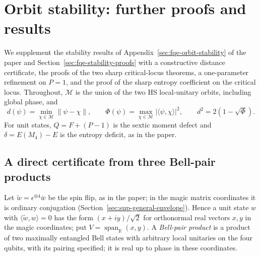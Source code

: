 \section{Orbit stability: further proofs and results}\label{sec:sup-stability}
We supplement the stability results of Appendix~\ref{sec:fqe-orbit-stability} of the paper and Section~\ref{sec:fqe-stability-proofs}
with a constructive distance certificate, the proofs of the two sharp critical-locus theorems,
a one-parameter refinement on $P=1$, and the proof of the sharp entropy coefficient on the critical locus.
Throughout, $\mathcal M$ is the union of the two HS local-unitary orbits,
including global phase, and
\[
 d(\psi)=\min_{\chi\in\mathcal M}\|\psi-\chi\|,\qquad
 \Phi(\psi)=\max_{\chi\in\mathcal M}|\langle\psi,\chi\rangle|^2,\qquad
 d^2=2(1-\sqrt{\Phi}).
\]
For unit states, $Q=F+(P-1)$ is the sextic moment defect and
$\delta=E(M_4)-E$ is the entropy deficit, as in the paper.

\subsection{A direct certificate from three Bell-pair products}\label{sec:sup-bellframe}
Let $\tilde w=\epsilon^{\otimes4}\bar w$ be the spin flip, as in the paper; in the magic matrix coordinates it is ordinary
conjugation (Section~\ref{sec:sup-general-envelope}). Hence a unit state $w$ with
$\langle\tilde w,w\rangle=0$ has the form $(x+iy)/\sqrt2$ for orthonormal real vectors $x,y$ in the magic coordinates; put
$V=\operatorname{span}_{\mathbb R}(x,y)$. A \emph{Bell-pair product} is a product of two maximally entangled Bell states with arbitrary local
unitaries on the four qubits, with its pairing specified; it is real up to phase in these coordinates.

